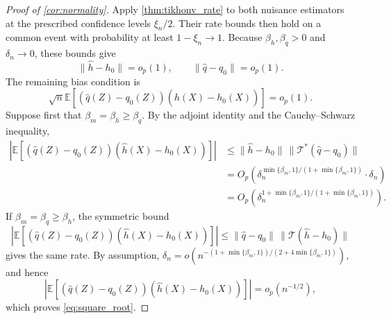 \begin{proof}[Proof of \cref{cor:normality}]
Apply \cref{thm:tikhonv_rate} to both nuisance estimators at the
prescribed confidence levels $\xi_n/2$. Their rate bounds then hold on
a common event with probability at least $1-\xi_n\to1$. Because
$\beta_h,\beta_q>0$ and $\delta_n\to0$, these bounds give
\begin{equation}\label{eq:conv_hq}
\| \hat{h} -h_{0} \| =o_{p}( 1) ,\qquad \| \hat{q} -q_{0}\| =o_{p}( 1) .
\end{equation}
The remaining bias condition is
\begin{equation}\label{eq:square_root}
\sqrt{n}\mathbb{E}[(\hat{q}( Z) -q_{0}( Z))(\hat{h}( X) -h_{0}( X))] =o_{p}( 1) .
\end{equation}
Suppose first that $\beta_m=\beta_h\geqslant\beta_q$. By the adjoint identity and the Cauchy--Schwarz inequality,
\begin{align*}
\left|\mathbb{E}[(\hat{q}( Z) -q_{0}( Z))(\hat{h}( X) -h_{0}( X))]\right| & \leqslant \|\hat h-h_0\|\,\|\mathcal T^*(\hat q-q_0)\|\\
 & =O_{p}\left( \delta _{n}^{\min\{\beta _{m} ,1\} /( 1+\min\{\beta _{m} ,1\})} \cdot \delta _{n}\right)\\
 & =O_{p}\left( \delta _{n}^{1+\min\{\beta _{m} ,1\} /( 1+\min\{\beta _{m} ,1\})}\right) .
\end{align*}
If $\beta_m=\beta_q\geqslant\beta_h$, the symmetric bound
\[
\left|\mathbb{E}[(\hat{q}( Z) -q_{0}( Z))(\hat{h}( X) -h_{0}( X))]\right|
\leqslant \|\hat q-q_0\|\,\|\mathcal T(\hat h-h_0)\|
\]
gives the same rate. By assumption, $\delta _{n} =o\left( n^{-( 1+\min\{\beta _{m} ,1\}) /( 2+4\min\{\beta _{m} ,1\})}\right)$, and hence
\[
\left|\mathbb{E}[(\hat{q}( Z) -q_{0}( Z))(\hat{h}( X) -h_{0}( X))]\right| =o_{p}\left( n^{-1/2}\right),
\]
which proves \eqref{eq:square_root}.


\end{proof}
